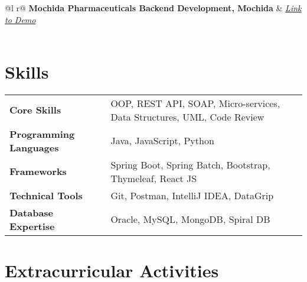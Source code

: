 \documentclass[a4paper, 12pt]{article}
\begin{document}
    \begin{tabularx}
    {\linewidth}{ @{}l r@{} }
        \textbf{Mochida Pharmaceuticals Backend
        Development, Mochida} & \hfill \textit{\href{https://www.mochida.co.jp/english/}{Link
        to Demo}} \\[3.75pt]
        \\
    \end{tabularx}


    \section{\textbf{Skills}}
    \begin{tabularx}
    {\linewidth}{@{}l X@{}}
        \textbf{Core Skills} & \normalsize{OOP, REST API, SOAP, Micro-services, Data Structures, UML, Code Review}
        \\ \textbf{Programming Languages} & \normalsize{Java, JavaScript, Python} \\
        \textbf{Frameworks} & \normalsize{Spring Boot, Spring Batch, Bootstrap, Thymeleaf, React JS}
        \\ \textbf{Technical Tools} & \normalsize{Git, Postman, IntelliJ IDEA, DataGrip}
        \\ \textbf{Database Expertise} & \normalsize{Oracle, MySQL, MongoDB, Spiral DB}
        \\
    \end{tabularx}


    \section{\textbf{Extracurricular Activities}}
\end{document}
